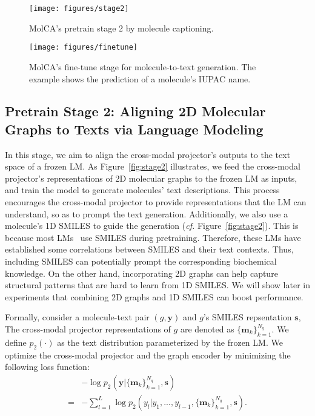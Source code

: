 \documentclass[11pt]{article}
\newcommand{\cf}{\emph{cf. }}
\newcommand{\Vtr}[1]{\boldsymbol{#1}}
\begin{document}
\begin{figure*}[t]
\centering
\begin{minipage}{.3\textwidth}
\centering
\texttt{[image: figures/stage2]}
\caption{MolCA's pretrain stage 2 by molecule captioning.}
\label{fig:stage2}
\end{minipage}
\hspace{5pt}
\begin{minipage}{.566\textwidth}
\centering
\texttt{[image: figures/finetune]}
\caption{MolCA's fine-tune stage for molecule-to-text generation. The example shows the prediction of a molecule's IUPAC name.}
\label{fig:finetune}
\end{minipage}
 \vspace{-4mm}
\end{figure*}

\subsection{Pretrain Stage 2: Aligning 2D Molecular Graphs to Texts via Language Modeling}
In this stage, we aim to align the cross-modal projector's outputs to the text space of a frozen LM. As Figure~\ref{fig:stage2} illustrates, we feed the cross-modal projector's representations of 2D molecular graphs to the frozen LM as inputs, and train the model to generate molecules' text descriptions. This process encourages the cross-modal projector to provide representations that the LM can understand, so as to prompt the text generation. 
Additionally, we also use a molecule's 1D SMILES to guide the generation (\cf Figure~\ref{fig:stage2}). This is because most LMs~\citep{Galactica, LLama, OPT} use SMILES during pretraining. Therefore, these LMs have established some correlations between SMILES and their text contexts. Thus, including SMILES can potentially prompt the corresponding biochemical knowledge. On the other hand, incorporating 2D graphs can help capture structural patterns that are hard to learn from 1D SMILES. We will show later in experiments that combining 2D graphs and 1D SMILES can boost performance.

Formally, consider a molecule-text pair $(g, \Vtr{y})$ and $g$'s SMILES repsentation $\Vtr{s}$, The cross-modal projector representations of $g$ are denoted as $\{\Vtr{m}_k\}^{N_q}_{k=1}$. We define $p_2(\cdot)$ as the text distribution parameterized by the frozen LM. We optimize the cross-modal projector and the graph encoder by minimizing the following loss function:
\begin{align}
\nonumber & -\log p_2(\Vtr{y}|\{\Vtr{m}_k\}^{N_q}_{k=1}, \Vtr{s}) \\
= & -\sum_{l=1}^{L} \log p_2(y_l|y_1, ..., y_{l-1}, \{\Vtr{m}_k\}^{N_q}_{k=1}, \Vtr{s}).
\end{align}
\end{document}
